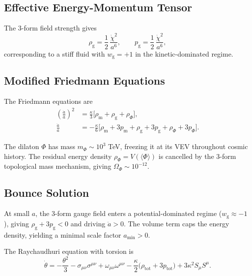 \documentclass[twocolumn,prd,amsmath,amssymb]{revtex4-2}
\begin{document}
\subsection{Effective Energy-Momentum Tensor}

The 3-form field strength gives
\begin{equation}
\rho_{\text{g}} = \frac12\,\frac{\dot{\chi}^2}{a^6},\qquad
p_{\text{g}} = \frac12\,\frac{\dot{\chi}^2}{a^6},
\label{eq:3form-eos}
\end{equation}
corresponding to a stiff fluid with $w_{\text{g}} = +1$ in the kinetic-dominated regime.

\subsection{Modified Friedmann Equations}

The Friedmann equations are
\begin{align}
\left(\frac{\dot{a}}{a}\right)^{2} &= \frac{\kappa}{3}
\bigl[\rho_{\text{m}}+\rho_{\text{g}}+\rho_{\Phi}\bigr],
\label{eq:friedmann-1}\\
\frac{\ddot{a}}{a} &= -\frac{\kappa}{6}
\bigl[\rho_{\text{m}}+3p_{\text{m}}+\rho_{\text{g}}+3p_{\text{g}}
+\rho_{\Phi}+3p_{\Phi}\bigr].
\label{eq:friedmann-2}
\end{align}

The dilaton $\Phi$ has mass $m_\Phi \sim 10^3$ TeV, freezing it at its VEV throughout
cosmic history.  The residual energy density $\rho_\Phi = V(\langle\Phi\rangle)$ is
cancelled by the 3-form topological mass mechanism, giving
$\Omega_\Phi \sim 10^{-12}$.

\subsection{Bounce Solution}

At small $a$, the 3-form gauge field enters a potential-dominated regime
($w_{\text{g}} \approx -1$), giving $\rho_{\text{g}}+3p_{\text{g}} < 0$ and driving
$\ddot{a}>0$.  The volume term caps the energy density, yielding a minimal scale factor
$a_{\min}>0$.

The Raychaudhuri equation with torsion is
\begin{equation}
\dot{\theta} = -\frac{\theta^2}{3} - \sigma_{\mu\nu}\sigma^{\mu\nu}
+ \omega_{\mu\nu}\omega^{\mu\nu}
- \frac{\kappa}{2}\bigl(\rho_{\text{tot}} + 3p_{\text{tot}}\bigr)
+ 3\kappa^2 S_\mu S^\mu.
\label{eq:raychaudhuri}
\end{equation}
\end{document}

